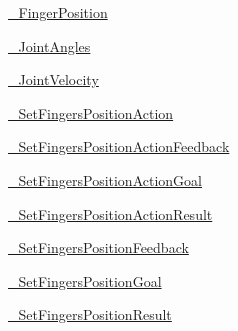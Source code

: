 \begin{DoxyCompactItemize}
\item 
 \hyperlink{namespacejaco__msgs_1_1msg_1_1__FingerPosition}{\+\_\+\+Finger\+Position}
\item 
 \hyperlink{namespacejaco__msgs_1_1msg_1_1__JointAngles}{\+\_\+\+Joint\+Angles}
\item 
 \hyperlink{namespacejaco__msgs_1_1msg_1_1__JointVelocity}{\+\_\+\+Joint\+Velocity}
\item 
 \hyperlink{namespacejaco__msgs_1_1msg_1_1__SetFingersPositionAction}{\+\_\+\+Set\+Fingers\+Position\+Action}
\item 
 \hyperlink{namespacejaco__msgs_1_1msg_1_1__SetFingersPositionActionFeedback}{\+\_\+\+Set\+Fingers\+Position\+Action\+Feedback}
\item 
 \hyperlink{namespacejaco__msgs_1_1msg_1_1__SetFingersPositionActionGoal}{\+\_\+\+Set\+Fingers\+Position\+Action\+Goal}
\item 
 \hyperlink{namespacejaco__msgs_1_1msg_1_1__SetFingersPositionActionResult}{\+\_\+\+Set\+Fingers\+Position\+Action\+Result}
\item 
 \hyperlink{namespacejaco__msgs_1_1msg_1_1__SetFingersPositionFeedback}{\+\_\+\+Set\+Fingers\+Position\+Feedback}
\item 
 \hyperlink{namespacejaco__msgs_1_1msg_1_1__SetFingersPositionGoal}{\+\_\+\+Set\+Fingers\+Position\+Goal}
\item 
 \hyperlink{namespacejaco__msgs_1_1msg_1_1__SetFingersPositionResult}{\+\_\+\+Set\+Fingers\+Position\+Result}
\end{DoxyCompactItemize}

